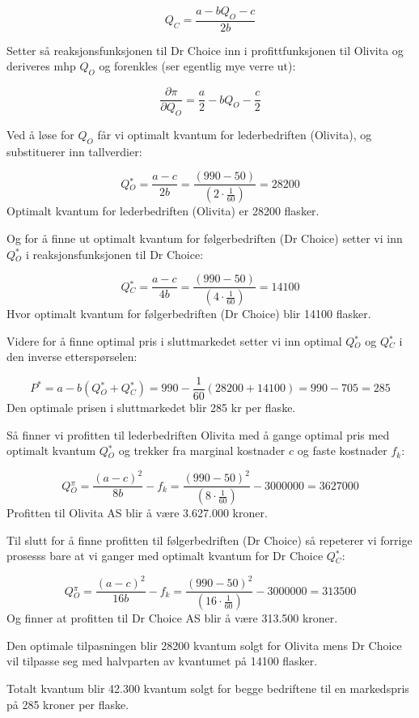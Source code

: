 \documentclass[
  12pt,
  a4paper,
  DIV=11,
  numbers=noendperiod]{scrartcl}
\begin{document}
\[ Q_C = \frac{a-b Q_O -c}{2b} \tag{3}\]

Setter så reaksjonsfunksjonen til Dr Choice inn i profittfunksjonen til
Olivita og deriveres mhp \(Q_O\) og forenkles (ser egentlig mye verre
ut):

\[\frac{\partial \pi}{\partial Q_O} = \frac{a}{2}-bQ_O - \frac{c}{2} \tag{4}\]

Ved å løse for \(Q_O\) får vi optimalt kvantum for lederbedriften
(Olivita), og substituerer inn tallverdier:

\[Q{_O^*} = \frac{a-c}{2b} = \frac{(990 - 50)}{(2 \cdot \frac{1}{60})}  = 28200 \tag{5}\]
Optimalt kvantum for lederbedriften (Olivita) er 28200 flasker.

Og for å finne ut optimalt kvantum for følgerbedriften (Dr Choice)
setter vi inn \(Q{_O^*}\) i reaksjonsfunksjonen til Dr Choice:

\[Q{_C^*} = \frac{a-c}{4b} = \frac{(990 - 50)}{(4 \cdot \frac{1}{60})} = 14100 \tag{6}\]
Hvor optimalt kvantum for følgerbedriften (Dr Choice) blir 14100
flasker.

Videre for å finne optimal pris i sluttmarkedet setter vi inn optimal
\(Q{_O^*}\) og \(Q{_C^*}\) i den inverse etterspørselen:

\[P^* = a - b(Q{_O^*}+Q{_C^*}) = 990 - \frac{1}{60}(28200+14100) = 990 - 705 = 285 \tag{7}\]
Den optimale prisen i sluttmarkedet blir 285 kr per flaske.

Så finner vi profitten til lederbedriften Olivita med å gange optimal
pris med optimalt kvantum \(Q{_O^*}\) og trekker fra marginal kostnader
\(c\) og faste kostnader \(f_k\):

\[ Q{_O^\pi} = \frac{(a-c)^2}{8b} - f_k =  \frac{(990-50)^2}{(8 \cdot \frac{1}{60})} - 3000000 = 3627000 \tag{8}\]
Profitten til Olivita AS blir å være 3.627.000 kroner.

Til slutt for å finne profitten til følgerbedriften (Dr Choice) så
repeterer vi forrige prosesss bare at vi ganger med optimalt kvantum for
Dr Choice \(Q{_C^*}\):

\[Q{_O^\pi} = \frac{(a-c)^2}{16b} - f_k =  \frac{(990-50)^2}{(16 \cdot \frac{1}{60})} - 3000000 = 313500 \tag{9}\]
Og finner at profitten til Dr Choice AS blir å være 313.500 kroner.

Den optimale tilpasningen blir 28200 kvantum solgt for Olivita mens Dr
Choice vil tilpasse seg med halvparten av kvantumet på 14100 flasker.

Totalt kvantum blir 42.300 kvantum solgt for begge bedriftene til en
markedspris på 285 kroner per flaske.
\end{document}
